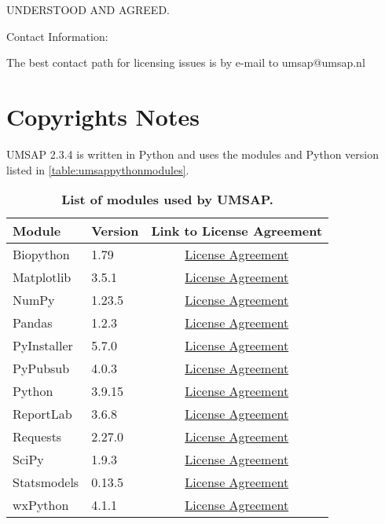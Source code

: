 UNDERSTOOD AND AGREED.

Contact Information:

The best contact path for licensing issues is by e-mail to umsap@umsap.nl

\section{Copyrights Notes}

UMSAP \num[parse-numbers=false]{2.3.4} is written in Python and uses the modules
and Python version listed in \autoref{table:umsappythonmodules}.
\begin{table}[h!]
    \centering
    \begin{tabular}{llc}
        \hline
        Module & Version & Link to License Agreement\\
        \hline
        Biopython   & \num{1.79}                        & \href{https://github.com/biopython/biopython/blob/master/LICENSE.rst}{License Agreement}\\
        Matplotlib  & \num[parse-numbers=false]{3.5.1}  & \href{https://matplotlib.org/3.3.4/users/license.html}{License Agreement}\\
        NumPy       & \num[parse-numbers=false]{1.23.5} & \href{https://numpy.org/doc/stable/license.html}{License Agreement}\\
        Pandas      & \num[parse-numbers=false]{1.2.3}  & \href{https://pandas.pydata.org/docs/getting_started/overview.html#license}{License Agreement}\\
        PyInstaller & \num[parse-numbers=false]{5.7.0}  & \href{https://pyinstaller.org/en/stable/license.html}{License Agreement}\\
        PyPubsub    & \num[parse-numbers=false]{4.0.3}  & \href{https://pypubsub.readthedocs.io/en/v4.0.3/about.html}{License Agreement}\\
        Python      & \num[parse-numbers=false]{3.9.15} & \href{https://docs.python.org/3.9/license.html}{License Agreement}\\
        ReportLab   & \num[parse-numbers=false]{3.6.8}  & \href{https://www.reportlab.com/dev/docs/faq/#1.3}{License Agreement}\\
        Requests    & \num[parse-numbers=false]{2.27.0} & \href{https://github.com/psf/requests/blob/main/LICENSE}{License Agreement}\\
        SciPy       & \num[parse-numbers=false]{1.9.3}  & \href{https://github.com/scipy/scipy/blob/main/LICENSE.txt}{License Agreement}\\
        Statsmodels & \num[parse-numbers=false]{0.13.5} & \href{https://www.statsmodels.org/stable/dev/index.html#license}{License Agreement}\\
        wxPython    & \num[parse-numbers=false]{4.1.1}  & \href{https://wxpython.org/pages/license/index.html}{License Agreement}\\
        \hline
    \end{tabular}
    \caption[List of modules used by UMSAP]{\textbf{List of modules used by UMSAP.}}
    \label{table:umsappythonmodules}
\end{table}
\newpage